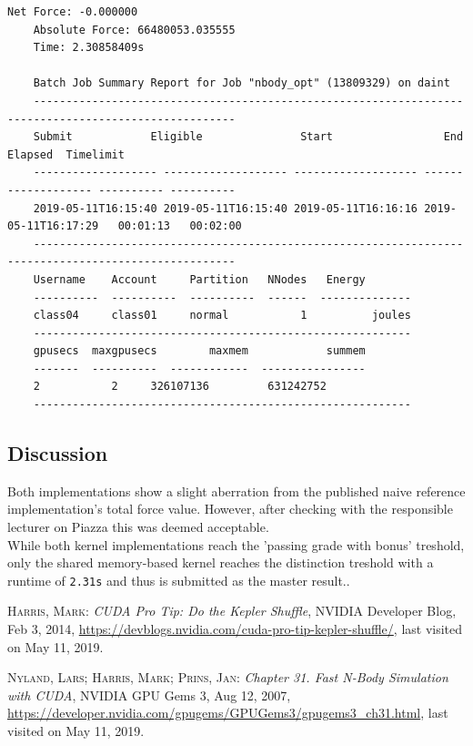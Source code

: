 \documentclass[11pt,a4paper]{article}
\begin{document}
\begin{lstlisting}[basicstyle=\tiny, frame=single, caption={Task 2: Shared memory-based force calculation kernel output.}, label={lst:2}]
	Net Force: -0.000000
	Absolute Force: 66480053.035555
	Time: 2.30858409s
	 
	Batch Job Summary Report for Job "nbody_opt" (13809329) on daint
	-----------------------------------------------------------------------------------------------------
	Submit            Eligible               Start                 End    Elapsed  Timelimit 
	------------------- ------------------- ------------------- ------------------- ---------- ---------- 
	2019-05-11T16:15:40 2019-05-11T16:15:40 2019-05-11T16:16:16 2019-05-11T16:17:29   00:01:13   00:02:00 
	-----------------------------------------------------------------------------------------------------
	Username    Account     Partition   NNodes   Energy
	----------  ----------  ----------  ------  --------------
	class04     class01     normal           1          joules
	----------------------------------------------------------
	gpusecs  maxgpusecs        maxmem            summem
	-------  ----------  ------------  ----------------
	2           2     326107136         631242752
	----------------------------------------------------------
	\end{lstlisting}

\subsection{Discussion}
Both implementations show a slight aberration from the published naive reference implementation's 
total force value. However, after checking with the responsible lecturer on Piazza this was deemed acceptable.\\
While both kernel implementations reach the 'passing grade with bonus' treshold, only the shared memory-based
kernel reaches the distinction treshold with a runtime of \texttt{2.31s} and thus is submitted as the master result..

\begin{thebibliography}{x}
	  {\scshape Harris, Mark}: {\itshape CUDA Pro Tip: Do the Kepler Shuffle}, NVIDIA Developer Blog, Feb 3, 2014,
	  \url{https://devblogs.nvidia.com/cuda-pro-tip-kepler-shuffle/}, last visited on May 11, 2019.


	  {\scshape Nyland, Lars; Harris, Mark; Prins, Jan}: {\itshape Chapter 31. Fast N-Body Simulation with CUDA}, NVIDIA GPU Gems 3, Aug 12, 2007,
	  \url{https://developer.nvidia.com/gpugems/GPUGems3/gpugems3_ch31.html}, last visited on May 11, 2019.

\end{thebibliography}
\end{document}
